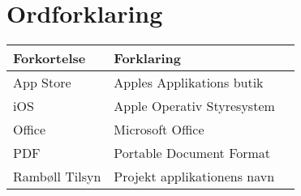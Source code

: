 \chapter*{Ordforklaring}

\begin{tabularx}{\textwidth}{l l X} \hline
	\textbf{Forkortelse}  & \textbf{Forklaring} \\ \hline
	App Store& Apples Applikations butik \\
	iOS& Apple Operativ Styresystem \\
	Office&  Microsoft Office& \\
	PDF& Portable Document Format \\
	Rambøll Tilsyn& Projekt applikationens navn \\
	
\end{tabularx}